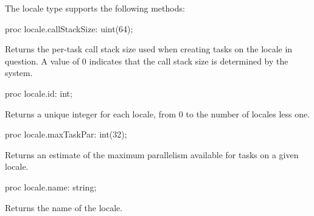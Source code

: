The locale type supports the following methods:


\begin{protohead}
proc locale.callStackSize: uint(64);
\end{protohead}
\begin{protobody}
Returns the per-task call stack size used when creating tasks on the
locale in question.  A value of 0 indicates that the call stack size
is determined by the system.
\end{protobody}

\begin{protohead}
proc locale.id: int;
\end{protohead}
\begin{protobody}
Returns a unique integer for each locale, from 0 to the number of
locales less one.
\end{protobody}


\begin{protohead}
proc locale.maxTaskPar: int(32);
\end{protohead}
\begin{protobody}
Returns an estimate of the maximum parallelism available for tasks
on a given locale.
\end{protobody}

\begin{protohead}
proc locale.name: string;
\end{protohead}
\begin{protobody}
Returns the name of the locale.
\end{protobody}

